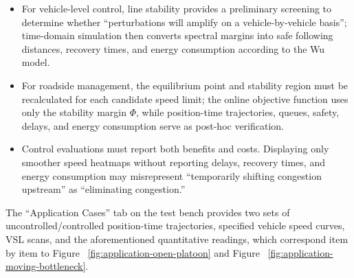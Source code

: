 \documentclass[11pt,a4paper,openany]{book}
\numberwithin{equation}{chapter}
\numberwithin{figure}{chapter}
\numberwithin{table}{chapter}
\begin{document}
\begin{tcolorbox}[resultbox,title=\textbf{Two case studies illustrate how stability analysis aids traffic management}]
\begin{itemize}[leftmargin=1.4em,itemsep=3pt]
\item




For vehicle-level control, line stability provides a preliminary screening to determine whether “perturbations will amplify on a vehicle-by-vehicle basis”; time-domain simulation then converts spectral margins into safe following distances, recovery times, and energy consumption according to the Wu model.







\item




For roadside management, the equilibrium point and stability region must be recalculated for each candidate speed limit; the online objective function uses only the stability margin $\Phi$, while position-time trajectories, queues, safety, delays, and energy consumption serve as post-hoc verification.







\item




Control evaluations must report both benefits and costs. Displaying only smoother speed heatmaps without reporting delays, recovery times, and energy consumption may misrepresent “temporarily shifting congestion upstream” as “eliminating congestion.”







\end{itemize}







The “Application Cases” tab on the test bench provides two sets of uncontrolled/controlled position-time trajectories, specified vehicle speed curves, VSL scans, and the aforementioned quantitative readings, which correspond item by item to Figure ~\ref{fig:application-open-platoon} and Figure ~\ref{fig:application-moving-bottleneck}.







\end{tcolorbox}
\end{document}
